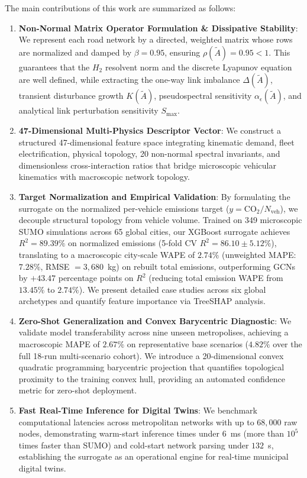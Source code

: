 \documentclass[journal]{IEEEtran}
\begin{document}
The main contributions of this work are summarized as follows:
\begin{enumerate}
    \item \textbf{Non-Normal Matrix Operator Formulation \& Dissipative Stability}: We represent each road network by a directed, weighted matrix whose rows are normalized and damped by $\beta = 0.95$, ensuring $\rho(\tilde{A}) = 0.95 < 1$. This guarantees that the $H_2$ resolvent norm and the discrete Lyapunov equation are well defined, while extracting the one-way link imbalance $\Delta(\tilde{A})$, transient disturbance growth $K(\tilde{A})$, pseudospectral sensitivity $\alpha_\epsilon(\tilde{A})$, and analytical link perturbation sensitivity $S_{\max}$.
    \item \textbf{47-Dimensional Multi-Physics Descriptor Vector}: We construct a structured 47-dimensional feature space integrating kinematic demand, fleet electrification, physical topology, 20 non-normal spectral invariants, and dimensionless cross-interaction ratios that bridge microscopic vehicular kinematics with macroscopic network topology.
    \item \textbf{Target Normalization and Empirical Validation}: By formulating the surrogate on the normalized per-vehicle emissions target ($y = \text{CO}_2 / N_{\text{veh}}$), we decouple structural topology from vehicle volume. Trained on 349 microscopic SUMO simulations across 65 global cities, our XGBoost surrogate achieves $R^2 = 89.39\%$ on normalized emissions (5-fold CV $R^2 = 86.10 \pm 5.12\%$), translating to a macroscopic city-scale WAPE of $2.74\%$ (unweighted MAPE: $7.28\%$, RMSE $= 3,680$~kg) on rebuilt total emissions, outperforming GCNs by $+43.47$ percentage points on $R^2$ (reducing total emission WAPE from $13.45\%$ to $2.74\%$). We present detailed case studies across six global archetypes and quantify feature importance via TreeSHAP analysis.
    \item \textbf{Zero-Shot Generalization and Convex Barycentric Diagnostic}: We validate model transferability across nine unseen metropolises, achieving a macroscopic MAPE of $2.67\%$ on representative base scenarios ($4.82\%$ over the full 18-run multi-scenario cohort). We introduce a 20-dimensional convex quadratic programming barycentric projection \cite{Boyd2004} that quantifies topological proximity to the training convex hull, providing an automated confidence metric for zero-shot deployment.
    \item \textbf{Fast Real-Time Inference for Digital Twins}: We benchmark computational latencies across metropolitan networks with up to $68,000$ raw nodes, demonstrating warm-start inference times under $6$~ms (more than $10^5$ times faster than SUMO) and cold-start network parsing under $132$~s, establishing the surrogate as an operational engine for real-time municipal digital twins.
\end{enumerate}
\end{document}
